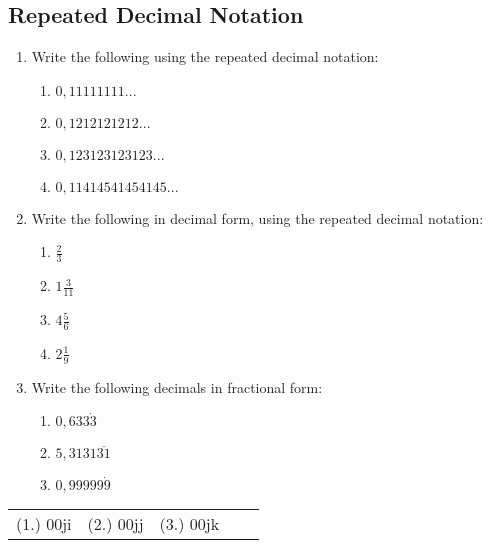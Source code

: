             \subsection{  Repeated Decimal Notation }
            \nopagebreak
      \label{m38348*id64513}\begin{enumerate}[noitemsep, label=\textbf{\arabic*}. ] 
            \label{m38348*uid23}\item Write the following using the repeated decimal notation:
\label{m38348*id64529}\begin{enumerate}[noitemsep, label=\textbf{\alph*}. ] 
            \label{m38348*uid24}\item $0,11111111...$\label{m38348*uid25}\item $0,1212121212...$\label{m38348*uid26}\item $0,123123123123...$\label{m38348*uid27}\item $0,11414541454145...$\end{enumerate}
        \label{m38348*uid28}\item Write the following in decimal form, using the repeated decimal notation:
\label{m38348*id64650}\begin{enumerate}[noitemsep, label=\textbf{\alph*}. ] 
            \label{m38348*uid29}\item $\frac{2}{3}$\label{m38348*uid30}\item $1\frac{3}{11}$\label{m38348*uid31}\item $4\frac{5}{6}$\label{m38348*uid32}\item $2\frac{1}{9}$\end{enumerate}
        \label{m38348*uid33}\item Write the following decimals in fractional form:
\label{m38348*id64767}\begin{enumerate}[noitemsep, label=\textbf{\alph*}. ] 
            \label{m38348*uid34}\item $0,633\dot{3}$\label{m38348*uid35}\item $5,3131\overline{31}$\label{m38348*uid36}\item $0,99999\dot{9}$\end{enumerate}
        \end{enumerate}
\practiceinfo
\par 
 \par \begin{tabular}[h]{ccccc}
 (1.) 00ji&  (2.) 00jj&  (3.) 00jk& \end{tabular}
